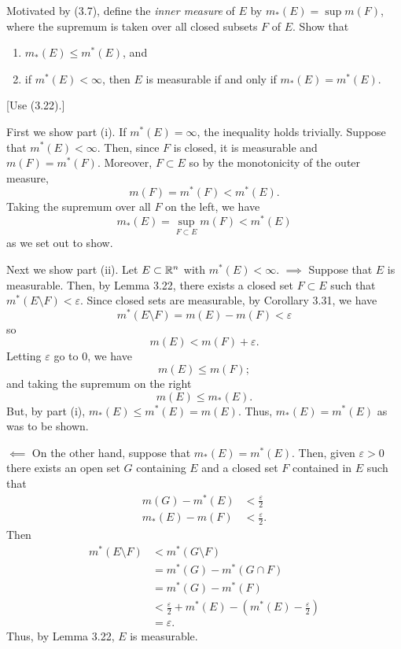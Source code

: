 \begin{problem}
  Motivated by (3.7), define the \emph{inner measure} of $E$ by
  $m_*(E)=\sup m(F)$, where the supremum is taken over all closed subsets
  $F$ of $E$. Show that
  \begin{enumerate}[label=(\roman*),noitemsep]
  \item $m_*(E)\leq m^*(E)$, and
  \item if $m^*(E)<\infty$, then $E$ is measurable if and only if
    $m_*(E)=m^*(E)$.
  \end{enumerate} [Use (3.22).]
\end{problem}
\begin{solution}
  First we show part (i). If $m^*(E)=\infty$, the inequality holds
  trivially. Suppose that $m^*(E)<\infty$. Then, since $F$ is closed, it is
  measurable and $m(F)=m^*(F)$. Moreover, $F\subset E$ so by the
  monotonicity of the outer measure,
  \[
    m(F)=m^*(F)<m^*(E).
  \]
  Taking the supremum over all $F$ on the left, we have
  \[
    m_*(E)=\sup_{F\subset E}m(F)<m^*(E)
  \]
  as we set out to show.

  Next we show part (ii). Let $E\subset\mathbb{R}^n$ with
  $m^*(E)<\infty$. $\implies$ Suppose that $E$ is measurable. Then, by
  Lemma 3.22, there exists a closed set $F\subset E$ such that
  $m^*(E\setminus F)<\varepsilon$. Since closed sets are measurable,
  by Corollary 3.31, we have
  \[
    m^*(E\setminus F)=m(E)-m(F)<\varepsilon
  \]
  so
  \[
    m(E)<m(F)+\varepsilon.
  \]
  Letting $\varepsilon$ go to $0$, we have
  \[
    m(E)\leq m(F);
  \]
  and taking the supremum on the right
  \[
    m(E)\leq m_*(E).
  \]
  But, by part (i), $m_*(E)\leq m^*(E)=m(E)$. Thus, $m_*(E)=m^*(E)$ as was
  to be shown.

  $\impliedby$ On the other hand, suppose that $m_*(E)=m^*(E)$. Then, given
  $\varepsilon>0$ there exists an open set $G$ containing $E$ and a closed
  set $F$ contained in $E$ such that
  \begin{align*}
    m(G)-m^*(E)&<\frac{\varepsilon}{2}\\
    m_*(E)-m(F)&<\frac{\varepsilon}{2}.
  \end{align*}
  Then
  \begin{align*}
    m^*(E\setminus F)
    &<m^*(G\setminus F)\\
    &=m^*(G)-m^*(G\cap F)\\
    &=m^*(G)-m^*(F)\\
    &<\frac{\varepsilon}{2}+m^*(E)-\left(m^*(E)-\frac{\varepsilon}{2}\right)\\
    &=\varepsilon.
  \end{align*}
  Thus, by Lemma 3.22, $E$ is measurable.
\end{solution}

